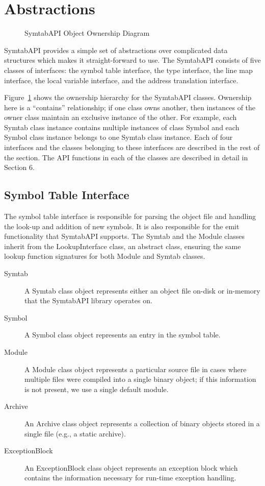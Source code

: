 \section{Abstractions}
\label{sec:abstractions}

\begin{figure}
    \caption{SymtabAPI Object Ownership Diagram}
    \label{fig:object-ownership}
\end{figure}

SymtabAPI provides a simple set of abstractions over complicated data structures
which makes it straight-forward to use. The SymtabAPI consists of five classes of
interfaces: the symbol table interface, the type interface, the line map
interface, the local variable interface, and the address translation interface. 

Figure~\ref{fig:object-ownership} shows the ownership hierarchy for the
SymtabAPI classes. Ownership here is a ``contains'' relationship; if one
class owns another, then instances of the owner class maintain an exclusive
instance of the other. For example, each Symtab class instance contains multiple
instances of class Symbol and each Symbol class instance belongs to one Symtab
class instance. Each of four interfaces and the classes belonging to these
interfaces are described in the rest of the section. The API functions in each
of the classes are described in detail in Section 6.

\subsection{Symbol Table Interface}

The symbol table interface is responsible for parsing the object file and
handling the look-up and addition of new symbols. It is also responsible for the
emit functionality that SymtabAPI supports. The Symtab and the Module classes
inherit from the LookupInterface class, an abstract class, ensuring the same
lookup function signatures for both Module and Symtab classes. 

\begin{description}
\item[Symtab] A Symtab class object represents either an object file on-disk or in-memory that the SymtabAPI library operates on.
\item[Symbol] A Symbol class object represents an entry in the symbol table.
\item[Module] A Module class object represents a particular source file in cases where multiple files were compiled into a single binary object; if this information is not present, we use a single default module.
\item[Archive] An Archive class object represents a collection of binary objects stored in a single file (e.g., a static archive). 
\item[ExceptionBlock] An ExceptionBlock class object represents an exception block which contains the information necessary for run-time exception handling.
\end{description}

